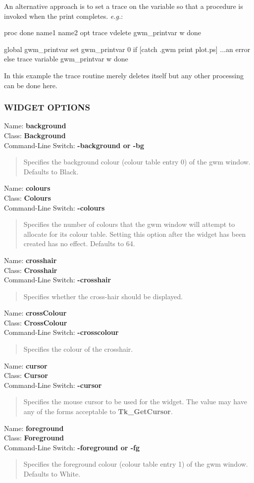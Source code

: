 \documentclass[twoside,11pt,nolof]{starlink}
\providecommand{\option}[3]{\par
Name: {\textbf{#1}} \\
Class: {\textbf{#2}} \\
Command-Line Switch: {\textbf{#3}} }
\newenvironment{rquote}{\begin{quote}\raggedright}{\end{quote}}
\begin{document}
An alternative approach is to set a trace on the variable so that a
procedure is invoked when the print completes. {\em{e.g.}}:

\begin{terminalv}
proc done {name1 name2 opt} {
    trace vdelete gwm_printvar w done
}

global gwm_printvar
set gwm_printvar 0
if [catch {.gwm print plot.ps}] {
    ...an error
} else {
    trace variable gwm_printvar w done
}
\end{terminalv}

In this example the trace routine merely deletes itself but any other
processing can be done here.

\subsubsection{WIDGET OPTIONS}

\option{background}{Background}{-background {\rm or} -bg}
\begin{rquote}
Specifies the background colour (colour table entry 0) of the gwm window.
Defaults to Black.
\end{rquote}

\option{colours}{Colours}{-colours}
\begin{rquote}
Specifies the number of colours that the gwm window will attempt to allocate
for its colour table. Setting this option after the widget has been created
has no effect. Defaults to 64.
\end{rquote}

\option{crosshair}{Crosshair}{-crosshair}
\begin{rquote}
Specifies whether the cross-hair should be displayed.
\end{rquote}

\option{crossColour}{CrossColour}{-crosscolour}
\begin{rquote}
Specifies the colour of the crosshair.
\end{rquote}

\option{cursor}{Cursor}{-cursor}
\begin{rquote}
Specifies the mouse cursor to be used for the widget.
The value may have any of the forms acceptable to \textbf{Tk\_GetCursor}.
\end{rquote}

\option{foreground}{Foreground}{-foreground {\rm or} -fg}
\begin{rquote}
Specifies the foreground colour (colour table entry 1) of the gwm window.
Defaults to White.
\end{rquote}
\end{document}
